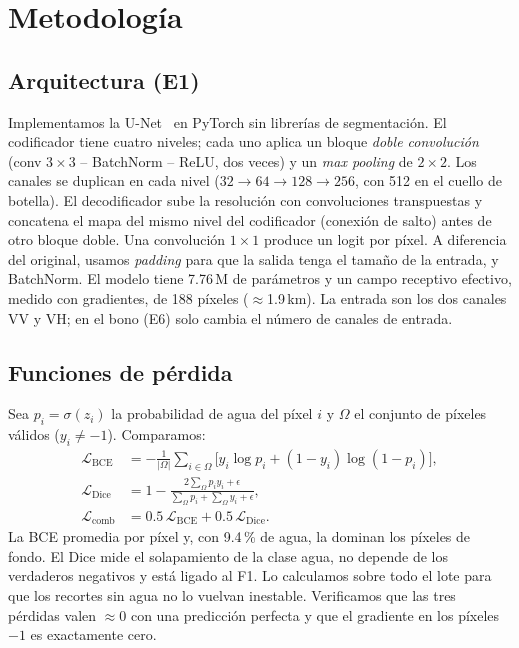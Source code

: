 \section{Metodología}
\label{sec:metodologia}

\subsection{Arquitectura (E1)}
Implementamos la U-Net~\cite{ronneberger2015unet} en PyTorch sin librerías de segmentación. El
codificador tiene cuatro niveles; cada uno aplica un bloque \emph{doble convolución}
(conv $3\times3$ -- BatchNorm -- ReLU, dos veces) y un \emph{max pooling} de $2\times2$. Los
canales se duplican en cada nivel ($32\to64\to128\to256$, con 512 en el cuello de botella). El
decodificador sube la resolución con convoluciones transpuestas y concatena el mapa del mismo
nivel del codificador (conexión de salto) antes de otro bloque doble. Una convolución $1\times1$
produce un logit por píxel. A diferencia del original, usamos \emph{padding} para que la salida
tenga el tamaño de la entrada, y BatchNorm. El modelo tiene 7.76\,M de parámetros y un campo
receptivo efectivo, medido con gradientes, de 188 píxeles ($\approx$1.9\,km). La entrada son los
dos canales VV y VH; en el bono (E6) solo cambia el número de canales de entrada.

\subsection{Funciones de pérdida}
Sea $p_i=\sigma(z_i)$ la probabilidad de agua del píxel $i$ y $\Omega$ el conjunto de píxeles
válidos ($y_i\neq-1$). Comparamos:
\begin{align}
\mathcal{L}_{\mathrm{BCE}} &= -\tfrac{1}{|\Omega|}\textstyle\sum_{i\in\Omega}
  \big[y_i\log p_i+(1-y_i)\log(1-p_i)\big],\\
\mathcal{L}_{\mathrm{Dice}} &= 1-\frac{2\sum_{\Omega}p_iy_i+\epsilon}
  {\sum_{\Omega}p_i+\sum_{\Omega}y_i+\epsilon},\\
\mathcal{L}_{\mathrm{comb}} &= 0.5\,\mathcal{L}_{\mathrm{BCE}}+0.5\,\mathcal{L}_{\mathrm{Dice}}.
\end{align}
La BCE promedia por píxel y, con 9.4\,\% de agua, la dominan los píxeles de fondo. El Dice mide
el solapamiento de la clase agua, no depende de los verdaderos negativos y está ligado al F1.
Lo calculamos sobre todo el lote para que los recortes sin agua no lo vuelvan inestable.
Verificamos que las tres pérdidas valen $\approx$0 con una predicción perfecta y que el gradiente
en los píxeles $-1$ es exactamente cero.

